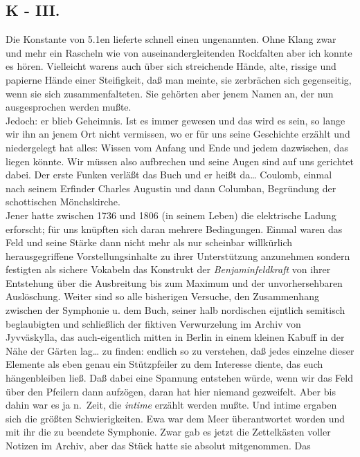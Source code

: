 \documentclass[
]{article}
\author{}
\date{\vspace{-2.5em}}
\begin{document}
\subsection{K - III.}\label{k---iii.}

Die Konstante von 5.1en lieferte schnell einen ungenannten. Ohne Klang
zwar und mehr ein Rascheln wie von auseinandergleitenden Rockfalten aber
ich konnte es hören. Vielleicht warens auch über sich streichende Hände,
alte, rissige und papierne Hände einer Steifigkeit, daß man meinte, sie
zerbrächen sich gegenseitig, wenn sie sich zusammenfalteten. Sie
gehörten aber jenem Namen an, der nun ausgesprochen werden mußte.\\
Jedoch: er blieb Geheimnis. Ist es immer gewesen und das wird es sein,
so lange wir ihn an jenem Ort nicht vermissen, wo er für uns seine
Geschichte erzählt und niedergelegt hat alles: Wissen vom Anfang und
Ende und jedem dazwischen, das liegen könnte. Wir müssen also aufbrechen
und seine Augen sind auf uns gerichtet dabei. Der erste Funken verläßt
das Buch und er heißt da\ldots{} Coulomb, einmal nach seinem Erfinder
Charles Augustin und dann Columban, Begründung der schottischen
Mönchskirche.\\
Jener hatte zwischen 1736 und 1806 (in seinem Leben) die elektrische
Ladung erforscht; für uns knüpften sich daran mehrere Bedingungen.
Einmal waren das Feld und seine Stärke dann nicht mehr als nur scheinbar
willkürlich herausgegriffene Vorstellungsinhalte zu ihrer Unterstützung
anzunehmen sondern festigten als sichere Vokabeln das Konstrukt der
\emph{Benjaminfeldkraft} von ihrer Entstehung über die Ausbreitung bis
zum Maximum und der unvorhersehbaren Auslöschung. Weiter sind so alle
bisherigen Versuche, den Zusammenhang zwischen der Symphonie u. dem
Buch, seiner halb nordischen eijntlich semitisch beglaubigten und
schließlich der fiktiven Verwurzelung im Archiv von Jyvväskylla, das
auch-eigentlich mitten in Berlin in einem kleinen Kabuff in der Nähe der
Gärten lag\ldots{} zu finden: endlich so zu verstehen, daß jedes
einzelne dieser Elemente als eben genau ein Stützpfeiler zu dem
Interesse diente, das euch hängenbleiben ließ. Daß dabei eine Spannung
entstehen würde, wenn wir das Feld über den Pfeilern dann aufzögen,
daran hat hier niemand gezweifelt. Aber bis dahin war es ja n.~Zeit, die
\emph{intime} erzählt werden mußte. Und intime ergaben sich die größten
Schwierigkeiten. Ewa war dem Meer überantwortet worden und mit ihr die
zu beendete Symphonie. Zwar gab es jetzt die Zettelkästen voller Notizen
im Archiv, aber das Stück hatte sie absolut mitgenommen. Das
\end{document}
